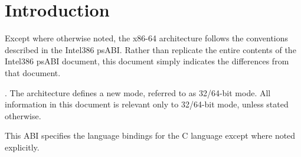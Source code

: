 
\chapter{Introduction}

Except where otherwise noted, the x86-64 architecture follows the
conventions described in the Intel386 psABI.  Rather than replicate
the entire contents of the Intel386 psABI document, this document
simply indicates the differences from that document.

.
The \xARCH architecture defines a new mode, referred to as 32/64-bit
mode. All information in this document is relevant only to 32/64-bit
mode, unless stated otherwise.

This ABI specifies the language bindings for the C language except
where noted explicitly.


